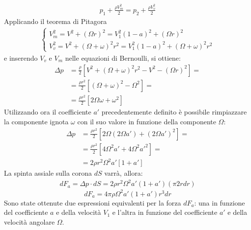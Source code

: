 \begin{align*}
p_1 + \frac{\rho V_m^2}{2} = p_2 + \frac{\rho V_v^2}{2}
\end{align*}
Applicando il teorema di Pitagora
\begin{align*}
\begin{cases}
V_m^2 = V^2 + \left( \Omega r \right)^2 = V_1^2 \left(1-a \right)^2 + \left( \Omega r \right)^2\\
V_v^2 = V^2 + \left( \Omega + \omega \right)^2 r^2= V_1^2 \left(1-a \right)^2 + \left( \Omega + \omega \right)^2 r^2
\end{cases}
\end{align*}
e inserendo $V_v$ e $V_m$ nelle equazioni di Bernoulli, si ottiene:
\begin{align*}
\Delta p & =\frac{\rho}{2} \left[ V^2 + \left( \Omega + \omega \right)^2 r^2 - V^2 - \left( \Omega r \right)^2 \right]=\\
& =\frac{\rho r^2}{2} \left[ \left( \Omega + \omega \right)^2 - \Omega^2 \right]= \\
& =\frac{\rho r^2}{2} \left[ 2 \Omega \omega + \omega^2 \right]
\end{align*}
Utilizzando ora il coefficiente $a'$ precedentemente definito è possibile rimpiazzare la componente ignota $\omega$ con il suo valore in funzione della componente $\Omega$:
\begin{align*}
\Delta p &= \frac{\rho r^2}{2} \left[ 2 \Omega \left( 2 \Omega a'\right) + \left( 2 \Omega a' \right)^2 \right]=\\
&= \frac{\rho r^2}{2} \left[ 4 \Omega^2 a' + 4 \Omega^2 a'^2 \right] = \\
&= 2 \rho r^2 \Omega^2 a' \left[ 1+a' \right]
\end{align*}
La spinta assiale sulla corona $dS$ varrà, allora:
\begin{align*}
dF_a = \Delta p \cdot dS = 2 \rho r^2 \Omega^2 a' \left(1 + a' \right) \left( \pi 2 r dr \right)
\end{align*}
\begin{equation}\label{eq:forza2}
dF_a = 4 \pi \rho \Omega^2 a' \left( 1+ a' \right) r^3 dr
\end{equation}
Sono state ottenute due espressioni equivalenti per la forza $dF_a$: una in funzione del coefficiente $a$ e della velocità $V_1$ e l'altra in funzione del coefficiente $a'$ e della velocità angolare $\Omega$. 

